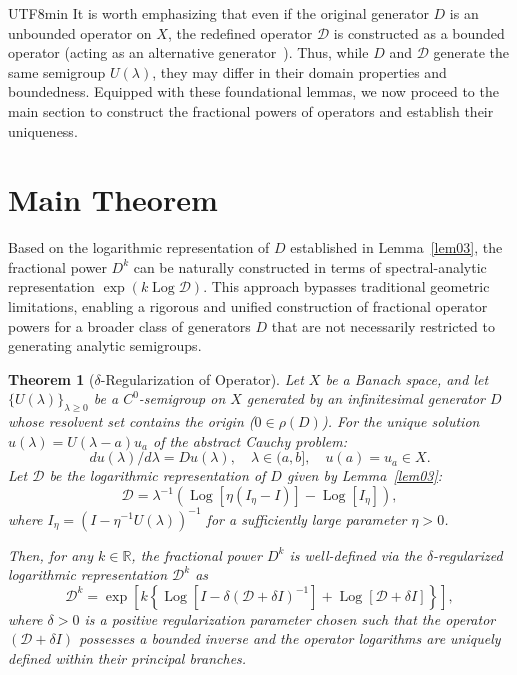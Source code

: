 \documentclass[10pt,a4paper]{article}
\newtheorem{theorem}{Theorem}[section]
\theoremstyle{definition}
\theoremstyle{remark}
\begin{document}
\begin{CJK}{UTF8}{min}
It is worth emphasizing that even if the original generator $D$ is an unbounded operator on $X$, the redefined operator $\mathcal{D}$ is constructed as a bounded operator (acting as an alternative generator~\cite{17iwata-3}). 
Thus, while $D$ and $\mathcal{D}$ generate the same semigroup $U(\lambda)$, they may differ in their domain properties and boundedness.
Equipped with these foundational lemmas, we now proceed to the main section to construct the fractional powers of operators and establish their uniqueness.



\section{Main Theorem}
Based on the logarithmic representation of $D$ established in Lemma~\ref{lem03}, the fractional power $D^k$ can be naturally constructed in terms of spectral-analytic representation $\exp(k \operatorname{Log} \mathcal{D})$.
This approach bypasses traditional geometric limitations, enabling a rigorous and unified construction of fractional operator powers for a broader class of generators $D$ that are not necessarily restricted to generating analytic semigroups.


\begin{theorem} [$\delta$-Regularization of Operator] \label{thm-01}
Let $X$ be a Banach space, and let $\{U(\lambda)\}_{\lambda \ge 0}$ be a $C^0$-semigroup on $X$ generated by an infinitesimal generator $D$ whose resolvent set contains the origin ($0 \in \rho(D)$). 
For the unique solution $u(\lambda) = U(\lambda-a)u_a$ of the abstract Cauchy problem:
\begin{equation} \label{cauchy-main}
d u(\lambda) /d \lambda  = Du(\lambda), \quad \lambda \in (a, b], 
\quad  u(a) = u_a \in X. 
\end{equation}
Let $\mathcal{D}$ be the logarithmic representation of $D$ given by Lemma~\ref{lem03}:
\[
\mathcal{D} = \lambda^{-1} \left( \operatorname{Log}[\eta(I_{\eta}-I)] - \operatorname{Log}[I_{\eta}] \right),
\]
where $I_{\eta} = (I - \eta^{-1} U(\lambda))^{-1}$ for a sufficiently large parameter $\eta > 0$.

Then, for any $k \in \mathbb{R}$, the fractional power $D^k$ is well-defined via the $\delta$-regularized logarithmic representation $\mathcal{D}^k$ as
\begin{equation} \label{fractional-def}
\mathcal{D}^k = \exp \left[ k \left\{ \operatorname{Log} \left[ I - \delta (\mathcal{D} + \delta I)^{-1} \right] + \operatorname{Log} [\mathcal{D} + \delta I] \right\} \right],
\end{equation}
where $\delta > 0$ is a positive regularization parameter chosen such that the operator $(\mathcal{D} + \delta I)$ possesses a bounded inverse and the operator logarithms are uniquely defined within their principal branches.
\end{theorem}



\end{CJK}
\end{document}
